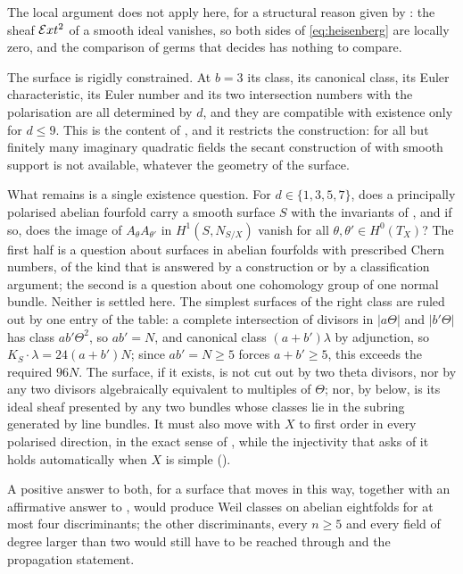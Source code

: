 \begin{remark}\label{rem:smoothremains}
The local argument does not apply here, for a structural reason given by
: the sheaf $\mathcal{E} xt^{2}$ of a smooth ideal vanishes,
so both sides of \eqref{eq:heisenberg} are locally zero, and the comparison of
germs that decides  has nothing to compare.

The surface is rigidly constrained. At $b=3$ its class, its canonical class,
its Euler characteristic, its Euler number and its two intersection numbers
with the polarisation are all determined by $d$, and they are compatible with
existence only for $d\le9$. This is the content of
, and it restricts the construction: for all but
finitely many imaginary quadratic fields the secant construction of
 with smooth support is not available, whatever the
geometry of the surface.

What remains is a single existence question. For $d\in\{1,3,5,7\}$, does a
principally polarised abelian fourfold carry a smooth surface $S$ with the
invariants of , and if so, does the image of
$A_{\theta}A_{\theta'}$ in $H^{1}(S,N_{S/X})$ vanish for all
$\theta,\theta'\in H^{0}(T_{X})$? The first half is a question about surfaces
in abelian fourfolds with prescribed Chern numbers, of the kind that is
answered by a construction or by a classification argument; the second is a
question about one cohomology group of one normal bundle. Neither is settled
here. The simplest surfaces of the right class are ruled out by one entry of
the table: a complete intersection of divisors in $|a\Theta|$ and
$|b'\Theta|$ has class $ab'\Theta^{2}$, so $ab'=N$, and canonical class
$(a+b')\lambda$ by adjunction, so $K_{S}\cdot\lambda=24(a+b')N$; since
$ab'=N\ge5$ forces $a+b'\ge5$, this exceeds the required $96N$. The
surface, if it exists, is not cut out by two theta divisors, nor by any two
divisors algebraically equivalent to multiples of $\Theta$; nor, by
 below, is its ideal sheaf presented by any two bundles
whose classes lie in the subring generated by line bundles. It must also move
with $X$ to first order in every polarised direction, in the exact sense of
, while the injectivity that 
asks of it holds automatically when $X$ is simple ().

A positive answer to both, for a surface that moves in this way, together
with an affirmative answer to \cite[Question 11.4]{Mar25b}, would produce
Weil classes on abelian
eightfolds for at most four discriminants; the other discriminants, every
$n\ge5$ and every field of degree larger than two would still have to be
reached through \cite[Proposition~2.13]{paperIII} and the propagation statement.
\end{remark}

